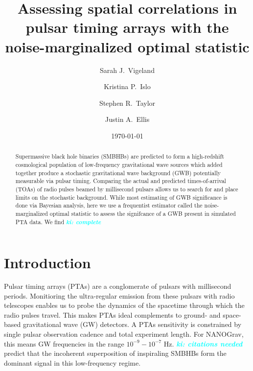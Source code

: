 \documentclass[twocolumn,aps,prd,superscriptaddress]{revtex4-1}
\newcommand{\ki}[1]{\textcolor{cyan}{\it{\textbf{ki: #1}}} }
\begin{document}
\title{Assessing spatial correlations in pulsar timing arrays with the noise-marginalized optimal statistic}


\author{Sarah J.\ Vigeland}

\author{Kristina P.\ Islo}

\author{Stephen R.\ Taylor}

\author{Justin A.\ Ellis}

\date{\today}  

\begin{abstract}
Supermassive black hole binaries (SMBHBs) are predicted to form a high-redshift cosmological population of low-frequency gravitational wave sources which added together produce a stochastic gravitational wave background (GWB) potentially measurable via pulsar timing. Comparing the actual and predicted times-of-arrival (TOAs) of radio pulses beamed by millisecond pulsars allows us to search for and place limits on the stochastic background. While most estimating of GWB significance is done via Bayesian analysis, here we use a frequentist estimator called the noise-marginalized optimal statistic to assess the signifcance of a GWB present in simulated PTA data. We find \ki{complete}

\end{abstract}

\maketitle


\section{Introduction}

Pulsar timing arrays (PTAs) are a conglomerate of pulsars with millisecond periods. Monitioring the ultra-regular emission from these pulsars with radio telescopes enables us to probe the dynamics of the spacetime through which the radio pulses travel. This makes PTAs ideal complements to ground- and space-based gravitational wave (GW) detectors. A PTAs sensitivity is constrained by single pulsar observation cadence and total experiment length. For NANOGrav, this means GW frequencies in the range $10^{-9} - 10^{-7}$ Hz. \ki{citations needed} predict that the incoherent superposition of inspiraling SMBHBs form the dominant signal in this low-frequency regime.  
\end{document}
